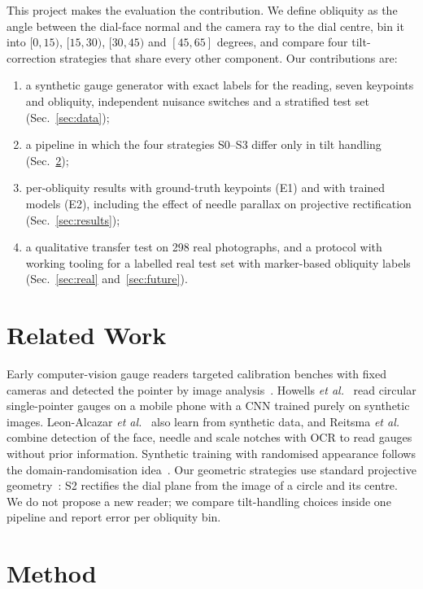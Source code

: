 \documentclass[conference]{IEEEtran}
\begin{document}
This project makes the evaluation the contribution. We define obliquity as the angle between the dial-face normal
and the camera ray to the dial centre, bin it into $[0,15)$, $[15,30)$, $[30,45)$ and $[45,65]$ degrees, and
compare four tilt-correction strategies that share every other component. Our contributions are:
\begin{enumerate}
\item a synthetic gauge generator with exact labels for the reading, seven keypoints and obliquity, independent
nuisance switches and a stratified test set (Sec.~\ref{sec:data});
\item a pipeline in which the four strategies S0--S3 differ only in tilt handling (Sec.~\ref{sec:method});
\item per-obliquity results with ground-truth keypoints (E1) and with trained models (E2), including the effect
of needle parallax on projective rectification (Sec.~\ref{sec:results});
\item a qualitative transfer test on 298 real photographs, and a protocol with working tooling for a labelled
real test set with marker-based obliquity labels (Sec.~\ref{sec:real} and~\ref{sec:future}).
\end{enumerate}

\section{Related Work}
Early computer-vision gauge readers targeted calibration benches with fixed cameras and detected the pointer by
image analysis~\cite{alegria2000}. Howells \emph{et al.}~\cite{howells2021} read circular single-pointer gauges
on a mobile phone with a CNN trained purely on synthetic images. Leon-Alcazar \emph{et al.}~\cite{leonalcazar2024}
also learn from synthetic data, and Reitsma \emph{et al.}~\cite{reitsma2024} combine detection of the face,
needle and scale notches with OCR to read gauges without prior information. Synthetic training with randomised
appearance follows the domain-randomisation idea~\cite{tobin2017}. Our geometric strategies use standard
projective geometry~\cite{hartley2004}: S2 rectifies the dial plane from the image of a circle and its centre.
We do not propose a new reader; we compare tilt-handling choices inside one pipeline and report error per
obliquity bin.

\section{Method}\label{sec:method}
\end{document}

